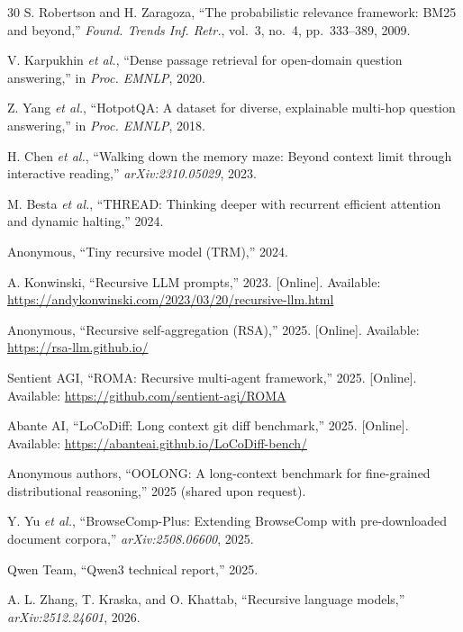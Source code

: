 \documentclass[journal, 10pt, letterpaper]{IEEEtran}
\begin{document}
\begin{thebibliography}{30}
S. Robertson and H. Zaragoza,
``The probabilistic relevance framework: BM25 and beyond,''
\textit{Found. Trends Inf. Retr.}, vol.~3, no.~4, pp.~333--389, 2009.

V. Karpukhin \textit{et al.},
``Dense passage retrieval for open-domain question answering,''
in \textit{Proc. EMNLP}, 2020.

Z. Yang \textit{et al.},
``HotpotQA: A dataset for diverse, explainable multi-hop question answering,''
in \textit{Proc. EMNLP}, 2018.

H. Chen \textit{et al.},
``Walking down the memory maze: Beyond context limit through interactive reading,''
\textit{arXiv:2310.05029}, 2023.

M. Besta \textit{et al.},
``THREAD: Thinking deeper with recurrent efficient attention and dynamic halting,''
2024.

Anonymous,
``Tiny recursive model (TRM),''
2024.

A. Konwinski,
``Recursive LLM prompts,''
2023. [Online]. Available: \url{https://andykonwinski.com/2023/03/20/recursive-llm.html}

Anonymous,
``Recursive self-aggregation (RSA),''
2025. [Online]. Available: \url{https://rsa-llm.github.io/}

Sentient AGI,
``ROMA: Recursive multi-agent framework,''
2025. [Online]. Available: \url{https://github.com/sentient-agi/ROMA}

Abante AI,
``LoCoDiff: Long context git diff benchmark,''
2025. [Online]. Available: \url{https://abanteai.github.io/LoCoDiff-bench/}

Anonymous authors,
``OOLONG: A long-context benchmark for fine-grained distributional reasoning,''
2025 (shared upon request).

Y. Yu \textit{et al.},
``BrowseComp-Plus: Extending BrowseComp with pre-downloaded document corpora,''
\textit{arXiv:2508.06600}, 2025.

Qwen Team,
``Qwen3 technical report,''
2025.

A. L. Zhang, T. Kraska, and O. Khattab,
``Recursive language models,''
\textit{arXiv:2512.24601}, 2026.

\end{thebibliography}
\end{document}
